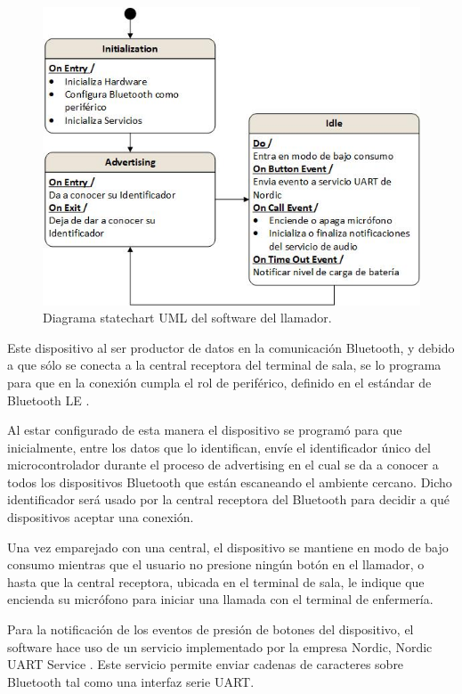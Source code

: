 \begin{figure}[htpb]
	\centering
	\includegraphics[scale=0.8]{./Figures/DCaller.jpeg}
	\caption{Diagrama statechart UML del software del llamador.}
	\label{fig:DiagramaSoftLlam}
\end{figure}

Este dispositivo al ser productor de datos en la comunicación Bluetooth, y debido a que sólo se conecta a la central receptora del terminal de sala, se lo programa para que en la conexión cumpla el rol de periférico, definido en el estándar de Bluetooth LE \citep{BLESPEC}. 

Al estar configurado de esta manera el dispositivo se programó para que inicialmente, entre los datos que lo identifican, envíe el identificador único del microcontrolador durante el proceso de advertising en el cual se da a conocer a todos los dispositivos Bluetooth que están escaneando el ambiente cercano. Dicho identificador será usado por la central receptora del Bluetooth para decidir a qué dispositivos aceptar una conexión.

Una vez emparejado con una central, el dispositivo se mantiene en modo de bajo consumo mientras que el usuario no presione ningún botón en el llamador, o hasta que la central receptora, ubicada en el terminal de sala, le indique que encienda su micrófono para iniciar una llamada con el terminal de enfermería.

Para la notificación de los eventos de presión de botones del dispositivo, el software hace uso de un servicio implementado por la empresa Nordic, Nordic UART Service \citep{NUS}. Este servicio permite enviar cadenas de caracteres sobre Bluetooth tal como una interfaz serie UART.

